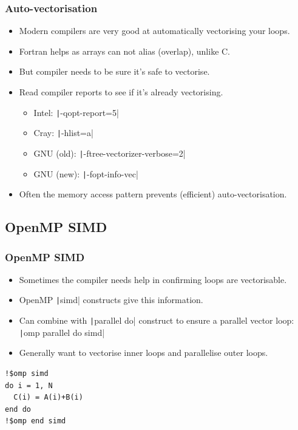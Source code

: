 \documentclass{beamer}
\begin{document}
\begin{frame}
\frametitle{Auto-vectorisation}
\begin{itemize}
  \item Modern compilers are very good at automatically vectorising your loops.
  \item Fortran helps as arrays can not alias (overlap), unlike C.
  \item But compiler needs to be sure it's safe to vectorise.
  \item Read compiler reports to see if it's already vectorising.
    \begin{itemize}
      \item Intel: \texttt|-qopt-report=5|
      \item Cray: \texttt|-hlist=a|
      \item GNU (old): \texttt|-ftree-vectorizer-verbose=2|
      \item GNU (new): \texttt|-fopt-info-vec|
    \end{itemize}
  \item Often the memory access pattern prevents (efficient) auto-vectorisation.
\end{itemize}
\end{frame}

\subsection{OpenMP SIMD}
\begin{frame}[fragile]
\frametitle{OpenMP SIMD}
\begin{itemize}
  \item Sometimes the compiler needs help in confirming loops are vectorisable.
  \item OpenMP \texttt|simd| constructs give this information.
  \item Can combine with \texttt|parallel do| construct to ensure a parallel vector loop: \texttt|omp parallel do simd|
  \item Generally want to vectorise inner loops and parallelise outer loops.
\end{itemize}

\begin{verbatim}
!$omp simd
do i = 1, N
  C(i) = A(i)+B(i)
end do
!$omp end simd
\end{verbatim}
\end{frame}
\end{document}
